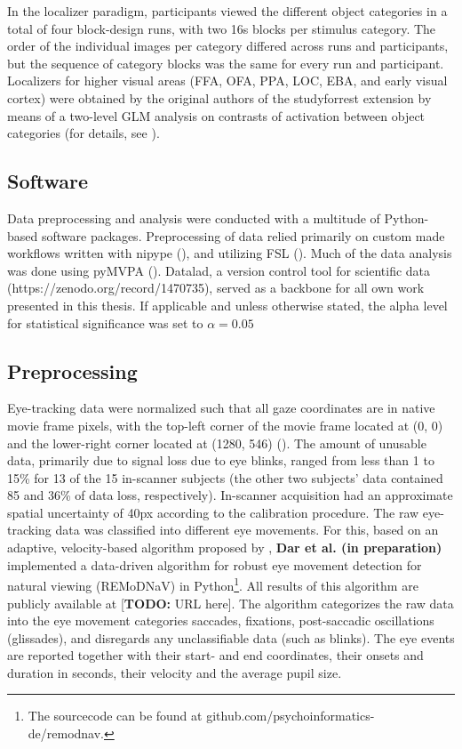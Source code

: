 \documentclass[a4paper, 12pt]{scrreprt}
\begin{document}
In the localizer paradigm, participants viewed the different object categories in a total of four block-design runs, with two 16s blocks per stimulus category. The order of the individual images per category differed across runs and participants, but the sequence of category blocks was the same for every run and participant. Localizers for higher visual areas (FFA, OFA, PPA, LOC, EBA, and early visual cortex) were obtained by the original authors of the studyforrest extension by means of a two-level GLM analysis on contrasts of activation between object categories (for details, see \cite{sengupta2016studyforrest}).

\subsection{Software}
Data preprocessing and analysis were conducted with a multitude of Python-based software packages. Preprocessing of data relied primarily on custom made workflows written with nipype (\cite{gorgolewski_krzysztof}), and utilizing FSL (\cite{jenkinson2012fsl}). Much of the data analysis was done using pyMVPA (\cite{hanke2009pymvpa}). Datalad, a version control tool for scientific data (https://zenodo.org/record/1470735), served as a backbone for all own work presented in this thesis. If applicable and unless otherwise stated, the alpha level for statistical significance was set to $\alpha = 0.05$

\subsection{Preprocessing}
Eye-tracking data were normalized such that all gaze coordinates are in native movie frame pixels, with the top-left corner of the movie frame located at (0, 0) and the lower-right corner located at (1280, 546) (\cite{hanke2016studyforrest}). The amount of unusable data, primarily due to signal loss due to eye blinks, ranged from less than 1 to 15\% for 13 of the 15 in-scanner subjects (the other two subjects’ data contained 85 and 36\% of data loss, respectively). In-scanner acquisition had an approximate spatial uncertainty of 40px according to the calibration procedure. \newline
The raw eye-tracking data was classified into different eye movements. For this, based on an adaptive, velocity-based algorithm proposed by \textcite{nystrom2010adaptive}, \textbf{Dar et al. (in preparation)} implemented a data-driven algorithm for robust eye movement detection for natural viewing (REMoDNaV) in Python\footnote{The sourcecode can be found at github.com/psychoinformatics-de/remodnav.}. All results of this algorithm are publicly available at [\textbf{TODO: }URL here]. The algorithm categorizes the raw data into the eye movement categories saccades, fixations, post-saccadic oscillations (glissades), and disregards any unclassifiable data (such as blinks). The eye events are reported together with their start- and end coordinates, their onsets and duration in seconds, their velocity and the average pupil size.
\end{document}
